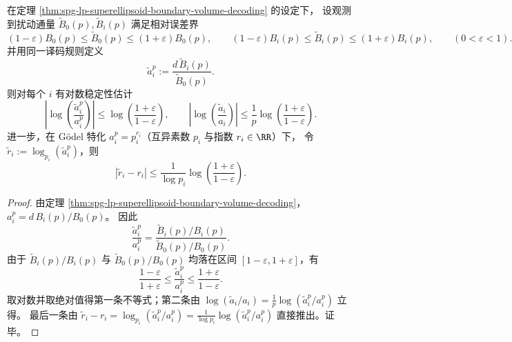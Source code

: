 \begin{proposition}\label{prop:spg-lp-superellipsoid-decoding-multiplicative-noise-stability}
在定理 \ref{thm:spg-lp-superellipsoid-boundary-volume-decoding} 的设定下，
设观测到扰动通量 \(\widetilde B_0(p),\widetilde B_i(p)\) 满足相对误差界
\[
(1-\varepsilon)B_0(p)\le \widetilde B_0(p)\le (1+\varepsilon)B_0(p),
\qquad
(1-\varepsilon)B_i(p)\le \widetilde B_i(p)\le (1+\varepsilon)B_i(p),
\qquad (0<\varepsilon<1).
\]
并用同一译码规则定义
\[
\widetilde a_i^p:=\frac{d\,\widetilde B_i(p)}{\widetilde B_0(p)}.
\]
则对每个 \(i\) 有对数稳定性估计
\[
\left|\log\!\left(\frac{\widetilde a_i^p}{a_i^p}\right)\right|
\le
\log\!\left(\frac{1+\varepsilon}{1-\varepsilon}\right),
\qquad
\left|\log\!\left(\frac{\widetilde a_i}{a_i}\right)\right|
\le
\frac{1}{p}\log\!\left(\frac{1+\varepsilon}{1-\varepsilon}\right).
\]
进一步，在 Gödel 特化 \(a_i^p=p_i^{r_i}\)（互异素数 \(p_i\) 与指数 \(r_i\in\RR\)）下，
令 \(\widetilde r_i:=\log_{p_i}(\widetilde a_i^p)\)，则
\[
|\widetilde r_i-r_i|
\le
\frac{1}{\log p_i}\log\!\left(\frac{1+\varepsilon}{1-\varepsilon}\right).
\]
\end{proposition}
\begin{proof}
由定理 \ref{thm:spg-lp-superellipsoid-boundary-volume-decoding}，
\(
a_i^p=d\,B_i(p)/B_0(p)
\)。
因此
\[
\frac{\widetilde a_i^p}{a_i^p}
=\frac{\widetilde B_i(p)/B_i(p)}{\widetilde B_0(p)/B_0(p)}.
\]
由于 \(\widetilde B_i(p)/B_i(p)\) 与 \(\widetilde B_0(p)/B_0(p)\) 均落在区间 \([1-\varepsilon,1+\varepsilon]\)，有
\[
\frac{1-\varepsilon}{1+\varepsilon}
\le
\frac{\widetilde a_i^p}{a_i^p}
\le
\frac{1+\varepsilon}{1-\varepsilon}.
\]
取对数并取绝对值得第一条不等式；第二条由
\(
\log(\widetilde a_i/a_i)=\frac{1}{p}\log(\widetilde a_i^p/a_i^p)
\)
立得。
最后一条由
\(
\widetilde r_i-r_i=\log_{p_i}(\widetilde a_i^p/a_i^p)=\frac{1}{\log p_i}\log(\widetilde a_i^p/a_i^p)
\)
直接推出。证毕。
\end{proof}

